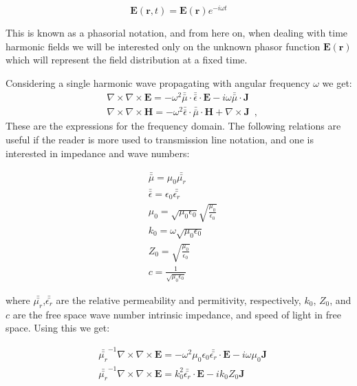 $$ \mathbf{E}(\mathbf{r},t) =\mathbf{E}(\mathbf{r})e^{-i\omega t} $$

This is known as a phasorial notation, and from here on, when dealing with time harmonic fields we will be interested only on the unknown phasor function $\mathbf{E}(\mathbf{r})$ which will represent the field distribution at a fixed time.

Considering a single harmonic wave propagating with angular frequency $\omega$ we get:
\begin{align}
&\nabla\times\nabla\times \mathbf{E} = -\omega^2\bar{\bar{\mu}}\cdot\bar{\bar{\epsilon}}\cdot \mathbf{E} - i\omega\bar{\bar{\mu}}\cdot  \mathbf{J} \label{eq:E-wave-harmonic}\\
&\nabla\times\nabla\times \mathbf{H} = -\omega^2\bar{\bar{\epsilon}}\cdot\bar{\bar{\mu}}\cdot \mathbf{H} + \nabla\times \mathbf{J} \label{eq:H-wave-harmonic} \enspace ,
\end{align}
These are the expressions for the frequency domain. The following relations are useful if the reader is more used to transmission line notation, and one is interested in impedance and wave numbers:

\begin{align}
&\bar{\bar{\mu}} = \mu_0\bar{\bar{\mu_r}}\\
&\bar{\bar{\epsilon}} = \epsilon_0\bar{\bar{\epsilon_r}}\\
&\mu_0 =\sqrt{\mu_0\epsilon_0}\sqrt{\frac{\mu_0}{\epsilon_0}}\\
&k_0 = \omega\sqrt{\mu_0\epsilon_0}\\
&Z_0 = \sqrt{\frac{\mu_0}{\epsilon_0}}\\
&c = \frac{1}{\sqrt{\mu_0\epsilon_0}}
\end{align}

where $\bar{\bar{\mu_r}}$,$\bar{\bar{\epsilon_r}}$  are the relative permeability and permitivity, respectively, $k_0$, $Z_0$, and $c$ are the free space wave number intrinsic impedance, and speed of light in free space. Using this we get:

\begin{align}
&\bar{\bar{\mu_r}}^{-1}\nabla\times\nabla\times \mathbf{E} = -\omega^2\mu_0\epsilon_0\bar{\bar{\epsilon_r}}\cdot \mathbf{E} - i\omega\mu_0 \mathbf{J} \\
&\bar{\bar{\mu_r}}^{-1}\nabla\times\nabla\times \mathbf{E} = k_0^{2}\bar{\bar{\epsilon_r}}\cdot \mathbf{E} - ik_0Z_0 \mathbf{J} \label{eq:E-wave-harmonic2}
\end{align}

